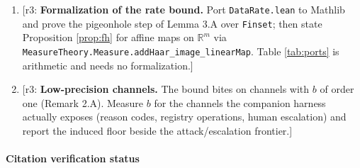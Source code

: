 \documentclass[11pt]{article}
\theoremstyle{definition}
\theoremstyle{remark}
\newcommand{\revnote}[1]{\textcolor{red!60!black}{[r3: #1]}}
\begin{document}
\begin{enumerate}
\item \revnote{\textbf{Formalization of the rate bound.} Port \texttt{DataRate.lean} to Mathlib and prove the pigeonhole step of Lemma 3.A over \texttt{Finset}; then state Proposition \ref{prop:fh} for affine maps on $\mathbb R^m$ via \texttt{MeasureTheory.Measure.addHaar\_image\_linearMap}. Table \ref{tab:ports} is arithmetic and needs no formalization.}
\item \revnote{\textbf{Low-precision channels.} The bound bites on channels with $b$ of order one (Remark 2.A). Measure $b$ for the channels the companion harness actually exposes (reason codes, registry operations, human escalation) and report the induced floor beside the attack/escalation frontier.}
\end{enumerate}

\paragraph{Citation verification status}
\end{document}
